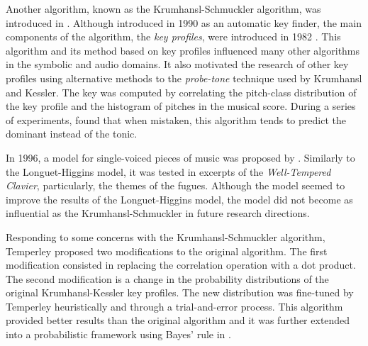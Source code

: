 Another algorithm, known as the Krumhansl-Schmuckler
algorithm, was introduced in
\textcite{krumhansl1990cognitive}. Although introduced in
1990 as an automatic key finder, the main components of the
algorithm, the \emph{key profiles}, were introduced in 1982
\parencite{krumhansl1982tracing}. This algorithm and its
method based on key profiles influenced many other
algorithms in the symbolic and audio domains. It also
motivated the research of other key profiles using
alternative methods to the \emph{probe-tone} technique used
by Krumhansl and Kessler. The key was computed by
correlating the pitch-class distribution of the key profile
and the histogram of pitches in the musical score. During a
series of experiments, \textcite{sapp2011computational}
found that when mistaken, this algorithm tends to predict
the dominant instead of the tonic.



In 1996, a model for single-voiced pieces of music was
proposed by \textcite{vos1996parallelprocessing}. Similarly
to the Longuet-Higgins model, it was tested in excerpts of
the \emph{Well-Tempered Clavier}, particularly, the themes
of the fugues. Although the model seemed to improve the
results of the Longuet-Higgins model, the model did not
become as influential as the Krumhansl-Schmuckler in future
research directions.



Responding to some concerns with the Krumhansl-Schmuckler
algorithm, Temperley \textcite{temperley1999whats} proposed
two modifications to the original algorithm. The first
modification consisted in replacing the correlation
operation with a dot product. The second modification is a
change in the probability distributions of the original
Krumhansl-Kessler key profiles. The new distribution was
fine-tuned by Temperley heuristically and through a
trial-and-error process. This algorithm provided better
results than the original algorithm and it was further
extended into a probabilistic framework using Bayes' rule in
\textcite{temperley2002bayesian}.



